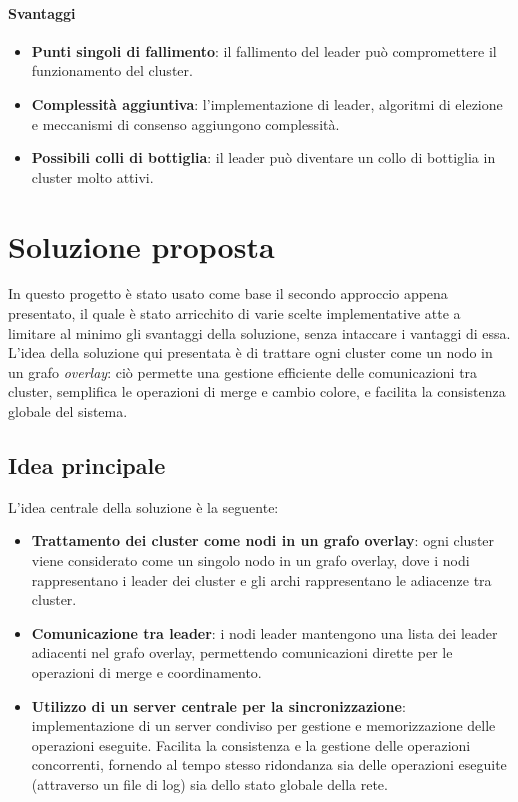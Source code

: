 \documentclass[12pt, a4paper]{report}
\begin{document}
\paragraph{Svantaggi}

\begin{itemize}
    \item \textbf{Punti singoli di fallimento}: il fallimento del leader pu\`o compromettere il funzionamento del cluster.
    \item \textbf{Complessit\`a aggiuntiva}: l'implementazione di leader, algoritmi di elezione e meccanismi di consenso aggiungono complessit\`a.
    \item \textbf{Possibili colli di bottiglia}: il leader pu\`o diventare un collo di bottiglia in cluster molto attivi.
\end{itemize}

\section{Soluzione proposta}

In questo progetto \`e stato usato come base il secondo approccio appena presentato, il quale \`e stato arricchito di varie scelte implementative atte a limitare al minimo gli svantaggi della soluzione, senza intaccare i vantaggi di essa. L'idea della soluzione qui presentata \`e di trattare ogni cluster come un nodo in un grafo \emph{overlay}: ci\`o permette una gestione efficiente delle comunicazioni tra cluster, semplifica le operazioni di merge e cambio colore, e facilita la consistenza globale del sistema.

\subsection{Idea principale}

L'idea centrale della soluzione \`e la seguente:

\begin{itemize}
    \item \textbf{Trattamento dei cluster come nodi in un grafo overlay}: ogni cluster viene considerato come un singolo nodo in un grafo overlay, dove i nodi rappresentano i leader dei cluster e gli archi rappresentano le adiacenze tra cluster.
    \item \textbf{Comunicazione tra leader}: i nodi leader mantengono una lista dei leader adiacenti nel grafo overlay, permettendo comunicazioni dirette per le operazioni di merge e coordinamento.
    \item \textbf{Utilizzo di un server centrale per la sincronizzazione}: implementazione di un server condiviso per gestione e memorizzazione delle operazioni eseguite. Facilita la consistenza e la gestione delle operazioni concorrenti, fornendo al tempo stesso ridondanza sia delle operazioni eseguite (attraverso un file di log) sia dello stato globale della rete.
\end{itemize}
\end{document}
